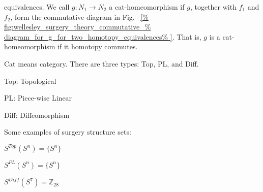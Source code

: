 \documentclass[crop=false,class=article,oneside]{standalone}
\begin{document}
        equivalences. We call $g:N_{1}\rightarrow N_{2}$ a
        cat-homeomorphism if $g$, together with $f_{1}$ and
        $f_{2}$, form the commutative diagram in Fig.~%
        \ref{%
            fig:wellesley_surgery_theory_commutative_%
            diagram_for_g_for_two_homotopy_equivalences%
        }.
        That is, $g$ is a cat-homeomorphism if it
        homotopy commutes.
        \begin{remark}
            Cat means category. There are three types:
            Top, PL, and Diff. 
            \begin{itemize}
                \begin{multicols}{3}
                    \item Top: Topological
                    \item PL: Piece-wise Linear
                    \item Diff: Diffeomorphism
                \end{multicols}
            \end{itemize}
        \end{remark}
        \begin{example}
            Some examples of surgery structure sets:
            \begin{enumerate}
                \begin{multicols}{3}
                    \item $S^{Top}(S^{n})=\{S^{n}\}$
                    \item $S^{PL}(S^{n})=\{S^{n}\}$
                    \item $S^{Diff}(S^{7})=\mathbb{Z}_{28}$
                \end{multicols}
            \end{enumerate}
        \end{example}
\end{document}
